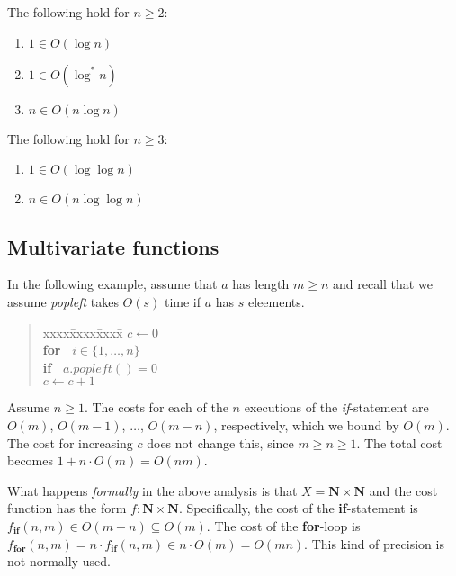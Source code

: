 \documentclass{tstextbook}
\begin{document}
\begin{example}
  The following hold for $n\geq 2$:
  \begin{enumerate}
    \item $1\in O(\log n)$
    \item $1\in O(\log^* n)$
    \item $n\in O(n\log n)$
  \end{enumerate}
  The following hold for $n\geq 3$:
  \begin{enumerate}
    \item $1\in O(\log\log n)$
    \item $n\in O(n\log\log n)$
  \end{enumerate}
\end{example}

\subsection{Multivariate functions}

In the following example, assume that $a$ has length $m\geq n$ and recall that we assume \emph{popleft} takes $O(s)$ time if $a$ has $s$ eleements.

\begin{quotation}
  \begin{tabbing}
    xxxx\=xxxx\=xxxx\=\kill
    $c \leftarrow{} 0$\\
    \textbf{for\ } $i\in \{1,\ldots,n\}$\\
    \> \textbf{if\ } $a.\mathit{popleft}() = 0$\\
    \>\> $c\leftarrow{} c + 1$\\
  \end{tabbing}
\end{quotation}

Assume $n\geq 1$.
The costs for each of the  $n$  executions of the \emph{if}-statement are $O(m)$, $O(m-1)$, $\ldots$, $O(m-n)$, respectively, which we bound by $O(m)$.
The cost for increasing $c$ does not change this, since $m\geq n\geq 1$.
The total cost becomes $1 + n\cdot O(m) = O(nm)$.

\medskip
What happens \emph{formally} in the above analysis is that $X = \mathbf N\times \mathbf N$ and the cost function has the form $f\colon \mathbf N\times \mathbf N$.
Specifically, the cost of the \textbf{if}-statement is $f_{\textbf{if}} (n,m) \in O(m - n)\subseteq O(m)$.
The cost of the \textbf{for}-loop is $f_{\textbf{for}}(n, m) = n\cdot f_{\textbf{if}} (n,m) \in  n\cdot O(m)=O(mn)$.
This kind of precision is not normally used.
\end{document}
